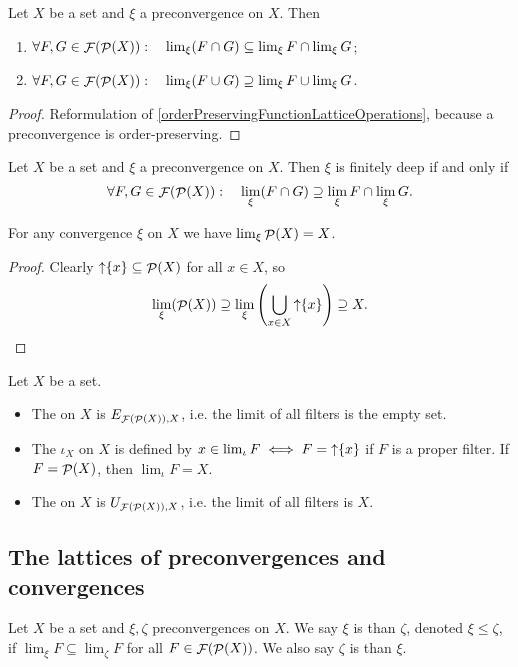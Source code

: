 \begin{lemma}
Let $X$ be a set and $\xi$ a preconvergence on $X$. Then
\begin{enumerate}
\item $\forall F,G \in \mathop{\mathcal{F}}(\mathop{\mathcal{P}}(X)): \quad \lim_\xi(F\cap G) \subseteq \lim_\xi F \cap \lim_\xi G$;
\item $\forall F,G \in \mathop{\mathcal{F}}(\mathop{\mathcal{P}}(X)): \quad \lim_\xi(F\cup G) \supseteq \lim_\xi F \cup \lim_\xi G$.
\end{enumerate}
\end{lemma}
\begin{proof}
Reformulation of \ref{orderPreservingFunctionLatticeOperations}, because a preconvergence is order-preserving.
\end{proof}
\begin{corollary}
Let $X$ be a set and $\xi$ a preconvergence on $X$. Then $\xi$ is finitely deep \textup{if and only if}
\[ \forall F,G \in \mathop{\mathcal{F}}(\mathop{\mathcal{P}}(X)): \quad \lim_\xi(F\cap G) \supseteq \lim_\xi F \cap \lim_\xi G. \]
\end{corollary}
\begin{corollary} \label{limitDegenerateFilter}
For any convergence $\xi$ on $X$ we have $\lim_\xi \mathop{\mathcal{P}}(X) = X$.
\end{corollary}
\begin{proof}
Clearly $\mathop{\uparrow}\{x\} \subseteq \mathop{\mathcal{P}}(X)$ for all $x\in X$, so
\[ \lim_\xi(\mathop{\mathcal{P}}(X)) \supseteq \lim_\xi \left(\bigcup_{x\in X}\mathop{\uparrow}\{x\}\right) \supseteq X. \]
\end{proof}


\begin{definition}
Let $X$ be a set.
\begin{itemize}
\item The  on $X$ is $E_{\mathop{\mathcal{F}}(\mathop{\mathcal{P}}(X)), X}$, i.e. the limit of all filters is the empty set.
\item The  $\iota_X$ on $X$ is defined by $x \in \lim_\iota F \iff F = \mathop{\uparrow}\{x\}$ if $F$ is a proper filter. If $F = \mathop{\mathcal{P}}(X)$, then $\lim_\iota F = X$.
\item The  on $X$ is $U_{\mathop{\mathcal{F}}(\mathop{\mathcal{P}}(X)), X}$, i.e. the limit of all filters is $X$.
\end{itemize}
\end{definition}

\subsection{The lattices of preconvergences and convergences}
\begin{definition}
Let $X$ be a set and $\xi,\zeta$ preconvergences on $X$. We say $\xi$ is  than $\zeta$, denoted $\xi \leq \zeta$, if $\lim_\xi F \subseteq \lim_\zeta F$ for all $F\in\mathop{\mathcal{F}}(\mathop{\mathcal{P}}(X))$. We also say $\zeta$ is  than $\xi$.
\end{definition}

